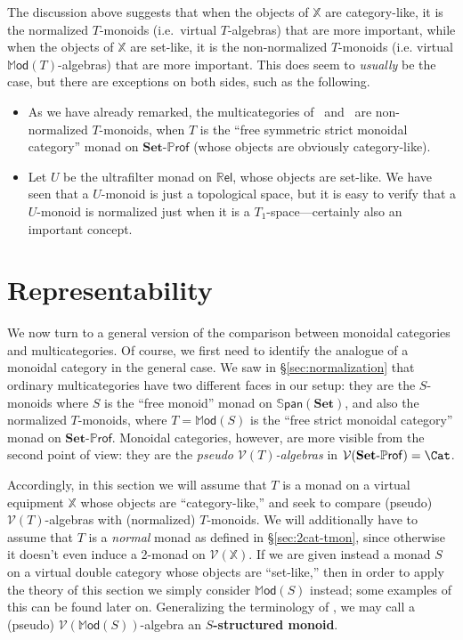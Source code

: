 \documentclass{tac}
\makeatletter
\newcommand{\calV}{\ensuremath{\mathcal{V}}}
\newcommand{\mb}[1]{{\mathbf{#1}}}
\newcommand{\PROF}[1]{\mathbf{#1}\mbox{-}\mathbb{P}\mathsf{rof}}
\newcommand{\SPAN}[1]{\mathbb{S}\mathsf{pan}\!\left(\mb{#1}\right)}
\newcommand{\MOD}{\mathbb{M}\mathsf{od}}
\newcommand{\Mod}{\ensuremath{\mathbb{M}\mathsf{od}}}
\newcommand{\Rel}{\mathbb{R}\mathsf{el}}
\numberwithin{equation}{section}
\def\currthmtype{}
\let\old@label\label
\def\label#1{%
    {\let\your@currentlabel\@currentlabel%
      \edef\@currentlabel{\currthmtype}%
      \old@label{label@name@#1}}%
    \old@label{#1}}
\makeatother
\begin{document}
\begin{remark}
  The discussion above suggests that when the objects of $\mathbb{X}$
  are category-like, it is the normalized $T$-monoids (i.e.\ virtual
  $T$-algebras) that are more important, while when the objects of
  $\mathbb{X}$ are set-like, it is the non-normalized $T$-monoids
  (i.e. virtual $\MOD(T)$-algebras) that are more important.
  This does seem to \emph{usually} be the case, but there are exceptions
  on both sides, such as the following.
  \begin{itemize}
  \item As we have already remarked, the multicategories
    of~\cite{bd:hda3} and~\cite{cheng:opetopic} are non-normalized
    $T$-monoids, when $T$ is the ``free symmetric strict monoidal
    category'' monad on $\PROF{Set}$ (whose objects are obviously
    category-like).
  \item Let $U$ be the ultrafilter monad on $\Rel$, whose objects are
    set-like.  We have seen that a $U$-monoid is just a topological
    space, but it is easy to verify that a $U$-monoid is normalized
    just when it is a $T_1$-space---certainly also an important
    concept.
  \end{itemize}
\end{remark}



\section{Representability}
\label{sec:vert-alg}

We now turn to a general version of the comparison between monoidal
categories and multicategories.  Of course, we first need to identify
the analogue of a monoidal category in the general case.  We saw in
\S\ref{sec:normalization} that ordinary multicategories have two
different faces in our setup: they are the $S$-monoids where $S$ is
the ``free monoid'' monad on $\SPAN{Set}$, and also the normalized
$T$-monoids, where $T=\Mod(S)$ is the ``free strict monoidal
category'' monad on $\PROF{Set}$.  Monoidal categories, however, are
more visible from the second point of view: they are the \emph{pseudo
  $\calV(T)$-algebras} in $\calV(\PROF{Set})=\Cat$.

Accordingly, in this section we will assume that $T$ is a monad on a
virtual equipment $\mathbb{X}$ whose objects are ``category-like,'' and seek to
compare (pseudo) $\calV(T)$-algebras with (normalized) $T$-monoids.
We will additionally have to assume that $T$ is a \emph{normal} monad
as defined in \S\ref{sec:2cat-tmon}, since otherwise it doesn't even
induce a 2-monad on $\calV(\mathbb{X})$.  If we are given instead a
monad $S$ on a virtual double category whose objects are ``set-like,'' then in order to
apply the theory of this section we simply consider $\Mod(S)$ instead;
some examples of this can be found later on.  Generalizing the
terminology of \cite[p.~165]{leinster:higher-opds}, we may call a
(pseudo) $\calV(\Mod(S))$-algebra an \textbf{$S$-structured monoid}.
\end{document}
